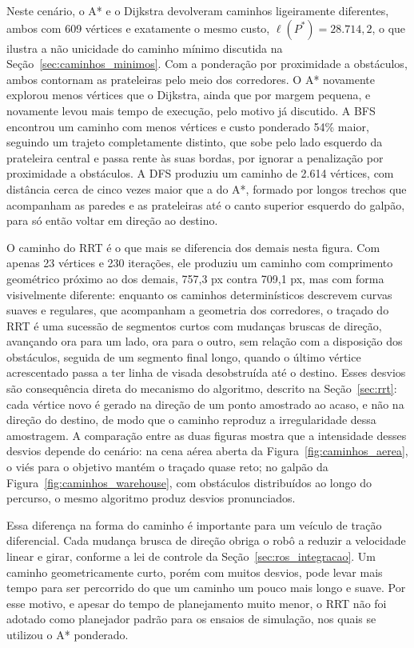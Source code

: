 \documentclass[
    12pt,
    openright,
    oneside,
    a4paper,
    english,
    brazil
]{abntex2}
\begin{document}
Neste cenário, o A* e o Dijkstra devolveram caminhos ligeiramente diferentes, ambos com 609 vértices e exatamente o mesmo custo, $\ell(P^\ast) = 28.714{,}2$, o que ilustra a não unicidade do caminho mínimo discutida na Seção~\ref{sec:caminhos_minimos}. Com a ponderação por proximidade a obstáculos, ambos contornam as prateleiras pelo meio dos corredores. O A* novamente explorou menos vértices que o Dijkstra, ainda que por margem pequena, e novamente levou mais tempo de execução, pelo motivo já discutido. A BFS encontrou um caminho com menos vértices e custo ponderado 54\% maior, seguindo um trajeto completamente distinto, que sobe pelo lado esquerdo da prateleira central e passa rente às suas bordas, por ignorar a penalização por proximidade a obstáculos. A DFS produziu um caminho de 2.614 vértices, com distância cerca de cinco vezes maior que a do A*, formado por longos trechos que acompanham as paredes e as prateleiras até o canto superior esquerdo do galpão, para só então voltar em direção ao destino.

O caminho do RRT é o que mais se diferencia dos demais nesta figura. Com apenas 23 vértices e 230 iterações, ele produziu um caminho com comprimento geométrico próximo ao dos demais, 757,3 px contra 709,1 px, mas com forma visivelmente diferente: enquanto os caminhos determinísticos descrevem curvas suaves e regulares, que acompanham a geometria dos corredores, o traçado do RRT é uma sucessão de segmentos curtos com mudanças bruscas de direção, avançando ora para um lado, ora para o outro, sem relação com a disposição dos obstáculos, seguida de um segmento final longo, quando o último vértice acrescentado passa a ter linha de visada desobstruída até o destino. Esses desvios são consequência direta do mecanismo do algoritmo, descrito na Seção~\ref{sec:rrt}: cada vértice novo é gerado na direção de um ponto amostrado ao acaso, e não na direção do destino, de modo que o caminho reproduz a irregularidade dessa amostragem. A comparação entre as duas figuras mostra que a intensidade desses desvios depende do cenário: na cena aérea aberta da Figura~\ref{fig:caminhos_aerea}, o viés para o objetivo mantém o traçado quase reto; no galpão da Figura~\ref{fig:caminhos_warehouse}, com obstáculos distribuídos ao longo do percurso, o mesmo algoritmo produz desvios pronunciados.

Essa diferença na forma do caminho é importante para um veículo de tração diferencial. Cada mudança brusca de direção obriga o robô a reduzir a velocidade linear e girar, conforme a lei de controle da Seção~\ref{sec:ros_integracao}. Um caminho geometricamente curto, porém com muitos desvios, pode levar mais tempo para ser percorrido do que um caminho um pouco mais longo e suave. Por esse motivo, e apesar do tempo de planejamento muito menor, o RRT não foi adotado como planejador padrão para os ensaios de simulação, nos quais se utilizou o A* ponderado.
\end{document}
